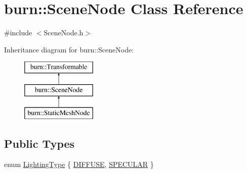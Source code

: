 \hypertarget{classburn_1_1_scene_node}{\section{burn\-:\-:Scene\-Node Class Reference}
\label{classburn_1_1_scene_node}
}


{\ttfamily \#include $<$Scene\-Node.\-h$>$}

Inheritance diagram for burn\-:\-:Scene\-Node\-:\begin{figure}[H]
\begin{center}
\leavevmode
\includegraphics[height=3.000000cm]{classburn_1_1_scene_node}
\end{center}
\end{figure}
\subsection*{Public Types}
\begin{DoxyCompactItemize}
\item 
enum \hyperlink{classburn_1_1_scene_node_ac71667bb8707fdadf6b2245d6e6c85cc}{Lighting\-Type} \{ \hyperlink{classburn_1_1_scene_node_ac71667bb8707fdadf6b2245d6e6c85cca5032b08cd92c6c86c32c088c81922632}{D\-I\-F\-F\-U\-S\-E}, 
\hyperlink{classburn_1_1_scene_node_ac71667bb8707fdadf6b2245d6e6c85ccaeec51fea1afff7847dd2acfe45121506}{S\-P\-E\-C\-U\-L\-A\-R}
 \}
\end{DoxyCompactItemize}
